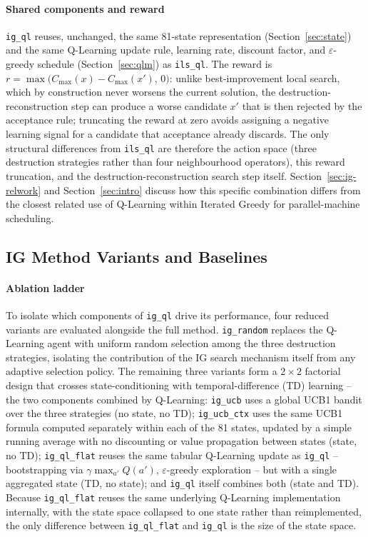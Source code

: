 \documentclass[final,3p,times,11pt,authoryear]{elsarticle}
\begin{document}
\paragraph{Shared components and reward}
\texttt{ig\_ql} reuses, unchanged, the same 81-state representation
(Section~\ref{sec:state}) and the same Q-Learning update rule, learning
rate, discount factor, and $\varepsilon$-greedy schedule
(Section~\ref{sec:qlm}) as \texttt{ils\_ql}.
The reward is $r = \max\bigl(C_{\max}(x) - C_{\max}(x'),\, 0\bigr)$:
unlike best-improvement local search, which by construction never
worsens the current solution, the destruction-reconstruction step can
produce a worse candidate $x'$ that is then rejected by the acceptance
rule; truncating the reward at zero avoids assigning a negative
learning signal for a candidate that acceptance already discards.
The only structural differences from \texttt{ils\_ql} are therefore the
action space (three destruction strategies rather than four
neighbourhood operators), this reward truncation, and the
destruction-reconstruction search step itself.
Section~\ref{sec:ig-relwork} and Section~\ref{sec:intro} discuss how
this specific combination differs from the closest related use of
Q-Learning within Iterated Greedy for parallel-machine
scheduling.

\subsection{IG Method Variants and Baselines}
\label{sec:igvariants}

\paragraph{Ablation ladder}
To isolate which components of \texttt{ig\_ql} drive its performance,
four reduced variants are evaluated alongside the full method.
\texttt{ig\_random} replaces the Q-Learning agent with uniform random
selection among the three destruction strategies, isolating the
contribution of the IG search mechanism itself from any adaptive
selection policy.
The remaining three variants form a $2{\times}2$ factorial design that
crosses state-conditioning with temporal-difference (TD) learning --
the two components combined by Q-Learning: \texttt{ig\_ucb} uses a
global UCB1 bandit \citep{AuerEtal2002} over the three strategies (no
state, no TD); \texttt{ig\_ucb\_ctx} uses the same UCB1 formula
computed separately within each of the 81 states, updated by a simple
running average with no discounting or value propagation between
states (state, no TD); \texttt{ig\_ql\_flat} reuses the same tabular
Q-Learning update as \texttt{ig\_ql} -- bootstrapping via
$\gamma\max_{a'}Q(a')$, $\varepsilon$-greedy exploration -- but with a
single aggregated state (TD, no state); and \texttt{ig\_ql} itself
combines both (state and TD).
Because \texttt{ig\_ql\_flat} reuses the same underlying Q-Learning
implementation internally, with the state space collapsed to one state
rather than reimplemented, the only difference between
\texttt{ig\_ql\_flat} and \texttt{ig\_ql} is the size of the state
space.
\end{document}
